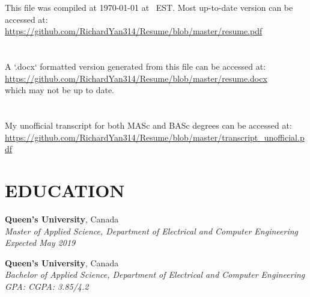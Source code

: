\documentclass[margin]{res}
\newcommand{\fullhrulefill}{%
  \hspace*{-\sectionwidth}\hrulefill%
  }
\begin{document}
\begin{resume}


\fullhrulefill

\section{}
This file was compiled at 
{\shortdate\today} at \currenttime~EST.
Most up-to-date version can be accessed at: \\
\url{https://github.com/RichardYan314/Resume/blob/master/resume.pdf}

\section{}
A `.docx` formatted version generated from this file can be accessed at: \\
\url{https://github.com/RichardYan314/Resume/blob/master/resume.docx} \\
which may not be up to date.

\section{}
My unofficial transcript for both MASc and BASc degrees can be accessed at:\\
\url{https://github.com/RichardYan314/Resume/blob/master/transcript_unofficial.pdf}


\section{EDUCATION}
\textbf{Queen's University}, Canada\\
{\sl Master of Applied Science, Department of Electrical and Computer Engineering\\
Expected May 2019}

\textbf{Queen's University}, Canada\\
{\sl Bachelor of Applied Science, Department of Electrical and Computer Engineering\\
GPA: 
\hfill CGPA: 3.85/4.2}




\end{resume}
\end{document}
